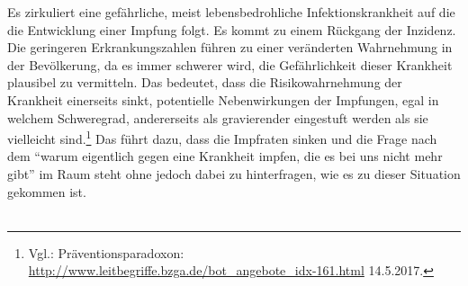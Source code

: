 \documentclass[
    a4paper,
    12pt,
    hyphens,
    chapterprefix=true,
    headheight=33pt,
    footheight=29pt,
    headings=optiontohead, %
]{scrartcl}
\begin{document}
{ Es zirkuliert eine gefährliche, meist lebensbedrohliche Infektionskrankheit auf die die Entwicklung einer Impfung folgt. Es kommt zu einem Rückgang der Inzidenz. Die geringeren Erkrankungszahlen führen zu einer veränderten Wahrnehmung in der Bevölkerung, da es immer schwerer wird, die Gefährlichkeit dieser Krankheit plausibel zu vermitteln. Das bedeutet, dass die Risikowahrnehmung der Krankheit einerseits sinkt, potentielle Nebenwirkungen der Impfungen, egal in welchem Schweregrad, andererseits als gravierender eingestuft werden als sie vielleicht sind.\footnote{Vgl.: Präventionsparadoxon:\\ \url{http://www.leitbegriffe.bzga.de/bot_angebote_idx-161.html} 14.5.2017.} Das führt dazu, dass die Impfraten sinken und die Frage nach dem "`warum eigentlich gegen eine Krankheit impfen, die es bei uns nicht mehr gibt"' im Raum steht ohne jedoch dabei zu hinterfragen, wie es zu dieser Situation gekommen ist.\\
\\

}
\end{document}
